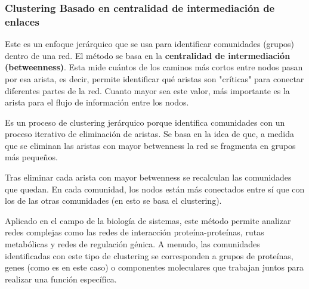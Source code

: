 \subsubsection{Clustering Basado en centralidad de intermediación de enlaces}

Este es un enfoque jerárquico que se usa para identificar comunidades (grupos) dentro de una red. El método se basa en la \textbf{centralidad de intermediación (betweenness)}. Esta mide cuántos de los caminos más cortos entre nodos pasan por esa arista, es decir, permite identificar qué aristas son "críticas" para conectar diferentes partes de la red. Cuanto mayor sea este valor, más importante es la arista para el flujo de información entre los nodos.

Es un proceso de clustering jerárquico porque identifica comunidades con un proceso iterativo de eliminación de aristas. Se basa en la idea de que, a medida que se eliminan las aristas con mayor betwenness la red se fragmenta en grupos más pequeños.

Tras eliminar cada arista con mayor betwenness se recalculan las comunidades que quedan. En cada comunidad, los nodos están más conectados entre sí que con los de las otras comunidades (en esto se basa el clustering).

Aplicado en el campo de la biología de sistemas, este método permite analizar redes complejas como las redes de interacción proteína-proteínas, rutas metabólicas y redes de regulación génica. A menudo, las comunidades identificadas con este tipo de clustering se corresponden a grupos de proteínas, genes (como es en este caso) o componentes moleculares que trabajan juntos para realizar una función específica.